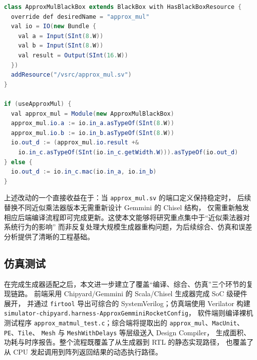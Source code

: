 \documentclass[12pt,a4paper,UTF8]{article}
\begin{document}
\begin{lstlisting}[caption={Gemmini 中近似乘法路径的关键生成器改动},label={lst:approx-gemmini-scala},language=Java,basicstyle=\ttfamily\small]
class ApproxMulBlackBox extends BlackBox with HasBlackBoxResource {
  override def desiredName = "approx_mul"
  val io = IO(new Bundle {
    val a = Input(SInt(8.W))
    val b = Input(SInt(8.W))
    val result = Output(SInt(16.W))
  })
  addResource("/vsrc/approx_mul.sv")
}

if (useApproxMul) {
  val approx_mul = Module(new ApproxMulBlackBox)
  approx_mul.io.a := io.in_a.asTypeOf(SInt(8.W))
  approx_mul.io.b := io.in_b.asTypeOf(SInt(8.W))
  io.out_d := (approx_mul.io.result +&
    io.in_c.asTypeOf(SInt(io.in_c.getWidth.W))).asTypeOf(io.out_d)
} else {
  io.out_d := io.in_c.mac(io.in_a, io.in_b)
}
\end{lstlisting}

上述改动的一个直接收益在于：当 \texttt{approx\_mul.sv} 的端口定义保持稳定时，
后续替换不同近似乘法器版本无需重新设计 Gemmini 的 Chisel 结构，
仅需重新触发相应后端编译流程即可完成更新。这使本文能够将研究重点集中于“近似乘法器对系统行为的影响”
而非反复处理大规模生成器重构问题，为后续综合、仿真和误差分析提供了清晰的工程基础。

\subsection{仿真测试}
\label{subsec:simulation}
在完成生成器适配之后，本文进一步建立了覆盖“编译、综合、仿真”三个环节的复现链路。
前端采用 Chipyard/Gemmini 的 Scala/Chisel 生成器完成 SoC 级硬件展开，
并通过 \texttt{firtool} 导出可综合的 SystemVerilog；仿真端使用 Verilator 构建
\texttt{simulator-chipyard.harness-ApproxGemminiRocketConfig}，
软件端则编译裸机测试程序 \texttt{approx\_matmul\_test.c}；综合端将提取出的
\texttt{approx\_mul}、\texttt{MacUnit}、\texttt{PE}、\texttt{Tile}、
\texttt{Mesh} 与 \texttt{MeshWithDelays} 等层级送入 Design Compiler，
生成面积、功耗与时序报告。整个流程既覆盖了从生成器到 RTL 的静态实现路径，
也覆盖了从 CPU 发起调用到阵列返回结果的动态执行路径。
\end{document}
